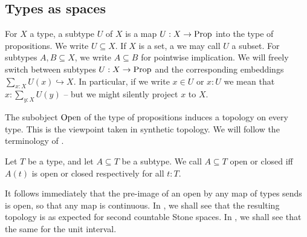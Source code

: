 \subsection{Types as spaces}
\begin{remark}
  For $X$ a type, a subtype $U$ of $X$ is a map $U:X\to\mathrm{Prop}$ 
  into the type of propositions. %
  We write $U\subseteq X$.
  If $X$ is a set, a we may call $U$ a subset. %
  For subtypes $A,B\subseteq X$, we write $A\subseteq B$ for pointwise implication.
  We will freely switch between subtypes $U:X\to\mathrm{Prop}$ and the corresponding embeddings
  $
    \sum_{x:X}U(x) \hookrightarrow  X.
  $
In particular, if we write $x\in U$ or $x:U$ 
we mean that $x:\sum_{y:X}U(y)$ -- but we might silently project $x$ to $X$.
\end{remark}


The subobject $\mathrm{Open}$ of the type of propositions induces a topology on every type. 
This is the viewpoint taken in synthetic topology. 
We will follow the terminology of \cite{SyntheticTopologyEscardo, SyntheticTopologyLesnik}. 

\begin{definition}
  Let $T$ be a type, and let $A\subseteq T$ be a subtype. 
  We call $A\subseteq T$ open or closed iff $A(t)$ is open or closed respectively for all $t:T$.
\end{definition}

\begin{remark}
  It follows immediately that the pre-image of an open by any map of types sends is open, so that any map is continuous. 
  In , we shall see that the resulting topology is as expected for second countable Stone spaces.
  In , we shall see that the same for the unit interval. 
\end{remark}



